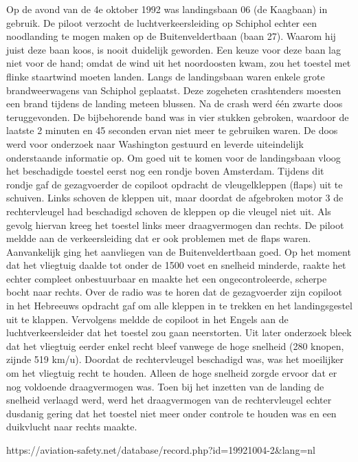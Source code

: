 Op de avond van de 4e oktober 1992 was landingsbaan 06 (de Kaagbaan) in gebruik. De piloot verzocht de luchtverkeersleiding op Schiphol echter een noodlanding te mogen maken op de Buitenveldertbaan (baan 27). Waarom hij juist deze baan koos, is nooit duidelijk geworden. Een keuze voor deze baan lag niet voor de hand; omdat de wind uit het noordoosten kwam, zou het toestel met flinke staartwind moeten landen. Langs de landingsbaan waren enkele grote brandweerwagens van Schiphol geplaatst. Deze zogeheten crashtenders moesten een brand tijdens de landing meteen blussen. Na de crash werd één zwarte doos teruggevonden. De bijbehorende band was in vier stukken gebroken, waardoor de laatste 2 minuten en 45 seconden ervan niet meer te gebruiken waren. De doos werd voor onderzoek naar Washington gestuurd en leverde uiteindelijk onderstaande informatie op.
Om goed uit te komen voor de landingsbaan vloog het beschadigde toestel eerst nog een rondje boven Amsterdam. Tijdens dit rondje gaf de gezagvoerder de copiloot opdracht de vleugelkleppen (flaps) uit te schuiven. Links schoven de kleppen uit, maar doordat de afgebroken motor 3 de rechtervleugel had beschadigd schoven de kleppen op die vleugel niet uit. Als gevolg hiervan kreeg het toestel links meer draagvermogen dan rechts. De piloot meldde aan de verkeersleiding dat er ook problemen met de flaps waren.
Aanvankelijk ging het aanvliegen van de Buitenveldertbaan goed. Op het moment dat het vliegtuig daalde tot onder de 1500 voet en snelheid minderde, raakte het echter compleet onbestuurbaar en maakte het een ongecontroleerde, scherpe bocht naar rechts. Over de radio was te horen dat de gezagvoerder zijn copiloot in het Hebreeuws opdracht gaf om alle kleppen in te trekken en het landingsgestel uit te klappen. Vervolgens meldde de copiloot in het Engels aan de luchtverkeersleider dat het toestel zou gaan neerstorten. Uit later onderzoek bleek dat het vliegtuig eerder enkel recht bleef vanwege de hoge snelheid (280 knopen, zijnde 519 km/u). Doordat de rechtervleugel beschadigd was, was het moeilijker om het vliegtuig recht te houden. Alleen de hoge snelheid zorgde ervoor dat er nog voldoende draagvermogen was. Toen bij het inzetten van de landing de snelheid verlaagd werd, werd het draagvermogen van de rechtervleugel echter dusdanig gering dat het toestel niet meer onder controle te houden was en een duikvlucht naar rechts maakte.

https://aviation-safety.net/database/record.php?id=19921004-2&lang=nl 


